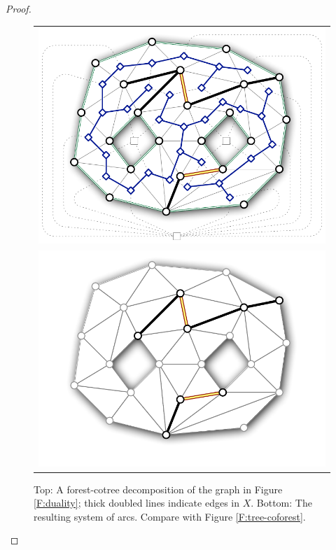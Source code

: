 \documentclass[twoside,leqno,twocolumn]{article}
\begin{document}
{\begin{proof}
\begin{figure}[htb]
\centering\footnotesize\sf
\begin{tabular}{c}
\includegraphics[scale=0.45]{Fig/forest-cotree2} \\
\includegraphics[scale=0.45]{Fig/forest-cotree-arcs2} \\[-3ex]
\end{tabular}
\caption{Top: A forest-cotree decomposition of the graph in Figure \ref{F:duality}; thick doubled lines indicate edges in $X$.  Bottom: The resulting system of arcs.  Compare with Figure \ref{F:tree-coforest}.}
\label{F:forest-cotree}
\end{figure}


\end{proof}}
\end{document}
